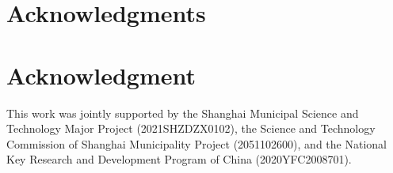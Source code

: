\documentclass[10pt,journal,compsoc]{IEEEtran}
\begin{document}
\ifCLASSOPTIONcompsoc
  \section*{Acknowledgments}
\else
  \section*{Acknowledgment}
\fi


This work was jointly supported by the Shanghai Municipal Science and Technology Major Project (2021SHZDZX0102), the Science and Technology Commission of Shanghai Municipality Project (2051102600), and the National Key Research and Development Program of China (2020YFC2008701).


\ifCLASSOPTIONcaptionsoff
  \newpage
\fi





% 









\end{document}
